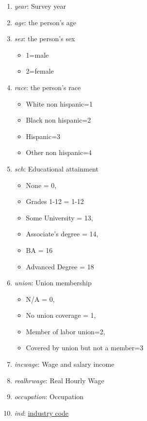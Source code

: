 \documentclass[
  letterpaper,
  DIV=11,
  numbers=noendperiod]{scrreprt}
\providecommand{\tightlist}{%
  \setlength{\itemsep}{0pt}\setlength{\parskip}{0pt}}\usepackage{longtable,booktabs,array}
\begin{document}
\begin{enumerate}
\def\labelenumi{\arabic{enumi}.}
\tightlist
\item
  \emph{year}: Survey year
\item
  \emph{age}: the person's age
\item
  \emph{sex}: the person's sex

  \begin{itemize}
  \tightlist
  \item
    1=male
  \item
    2=female
  \end{itemize}
\item
  \emph{race}: the person's race

  \begin{itemize}
  \tightlist
  \item
    White non hispanic=1
  \item
    Black non hispanic=2
  \item
    Hispanic=3
  \item
    Other non hispanic=4
  \end{itemize}
\item
  \emph{sch}: Educational attainment

  \begin{itemize}
  \tightlist
  \item
    None = 0,
  \item
    Grades 1-12 = 1-12
  \item
    Some University = 13,
  \item
    Associate's degree = 14,
  \item
    BA = 16
  \item
    Advanced Degree = 18
  \end{itemize}
\item
  \emph{union}: Union membership

  \begin{itemize}
  \tightlist
  \item
    N/A = 0,
  \item
    No union coverage = 1,
  \item
    Member of labor union=2,
  \item
    Covered by union but not a member=3
  \end{itemize}
\item
  \emph{incwage}: Wage and salary income
\item
  \emph{realhrwage}: Real Hourly Wage
\item
  \emph{occupation}: Occupation
\item
  \emph{ind}:
  \href{https://www.census.gov/naics/?58967?yearbck=2002}{industry code}
\end{enumerate}
\end{document}
